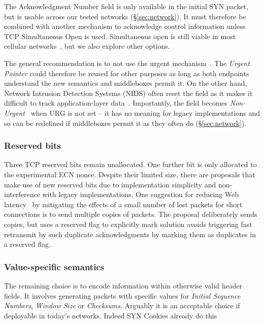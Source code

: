 \documentclass{sig-alternate-10pt}
\begin{document}
The Acknowledgment Number field is only available in the initial SYN packet, but is usable across our tested networks (\S\ref{sec:network}). It must therefore be combined with another mechanism to acknowledge control information unless TCP Simultaneous Open is used. Simultaneous open is still viable in most cellular networks~\cite{UntoldMiddlebox2011}, but we also explore other options.

The general recommendation is to not use the urgent mechanism~\cite{Gont:2011vi}. The \emph{Urgent Pointer} could therefore be reused for other purposes as long as both endpoints understand the new semantics and middleboxes permit it. On the other hand, Network Intrusion Detection Systems (NIDS) often reset the field as it makes it difficult to track application-layer data~\cite{seolma}. Importantly, the field becomes \emph{Non-Urgent}~\cite{Kuhlewind:2014vd} when URG is not set -- it has no meaning for legacy implementations and so can be redefined if middleboxes permit it as they often do (\S\ref{sec:network}).

\subsubsection*{Reserved bits}
\label{sec:reserved}

Three TCP reserved bits remain unallocated. One further bit is only allocated to the experimental ECN nonce\cite{Ely:uc}. Despite their limited size, there are proposals that make use of new reserved bits due to implementation simplicity and non-interference with legacy implementations. One suggestion for reducing Web latency~\cite{Flach:2013uy} by mitigating the effects of a small number of lost packets for short connections is to send multiple copies of packets. The proposal deliberately sends copies, but uses a reserved flag to explicitly mark solution avoids triggering fast retransmit by such duplicate acknowledgments by marking them as duplicates in a reserved flag.

\subsubsection*{Value-specific semantics}

The remaining choice is to encode information within otherwise valid header fields. It involves generating packets with specific values for \emph{Initial Sequence Numbers}, \emph{Window Size} or \emph{Checksums}. Arguably it is an acceptable choice if deployable in today's networks. Indeed SYN Cookies already do this~\cite{Eddy:2007to}
\end{document}
